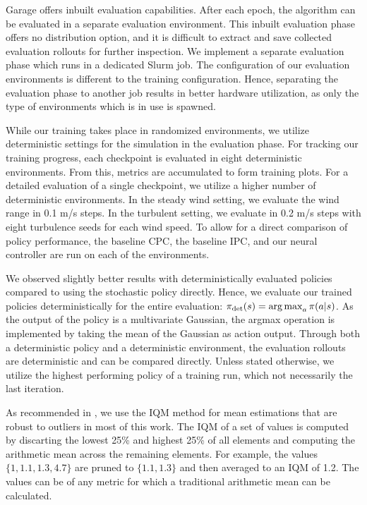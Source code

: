 Garage offers inbuilt evaluation capabilities. After each epoch, the algorithm can be evaluated in a separate evaluation environment. This inbuilt evaluation phase offers no distribution option, and it is difficult to extract and save collected evaluation rollouts for further inspection. We implement a separate evaluation phase which runs in a dedicated Slurm job. The configuration of our evaluation environments is different to the training configuration. Hence, separating the evaluation phase to another job results in better hardware utilization, as only the type of environments which is in use is spawned.

While our training takes place in randomized environments, we utilize deterministic settings for the simulation in the evaluation phase. For tracking our training progress, each checkpoint is evaluated in eight deterministic environments. From this, metrics are accumulated to form training plots. For a detailed evaluation of a single checkpoint, we utilize a higher number of deterministic environments. In the steady wind setting, we evaluate the wind range in 0.1 m/s steps. In the turbulent setting, we evaluate in 0.2 m/s steps with eight turbulence seeds for each wind speed. To allow for a direct comparison of policy performance, the baseline \ac{CPC}, the baseline \ac{IPC}, and our neural controller are run on each of the environments.

We observed slightly better results with deterministically evaluated policies compared to using the stochastic policy directly. Hence, we evaluate our trained policies deterministically for the entire evaluation: $\pi_{\text{det}}(s) = \operatorname*{arg\,max}_{a} \pi(a|s)$. As the output of the policy is a multivariate Gaussian, the argmax operation is implemented by taking the mean of the Gaussian as action output. Through both a deterministic policy and a deterministic environment, the evaluation rollouts are deterministic and can be compared directly. Unless stated otherwise, we utilize the highest performing policy of a training run, which not necessarily the last iteration.

As recommended in \citet{agarwalDeepReinforcementLearning2022}, we use the \acf{IQM} method for mean estimations that are robust to outliers in most of this work. The \ac{IQM} of a set of values is computed by discarting the lowest 25\% and highest 25\% of all elements and computing the arithmetic mean across the remaining elements. For example, the values $\{1, 1.1, 1.3, 4.7\}$ are pruned to $\{1.1, 1.3\}$ and then averaged to an IQM of 1.2. The values can be of any metric for which a traditional arithmetic mean can be calculated.

